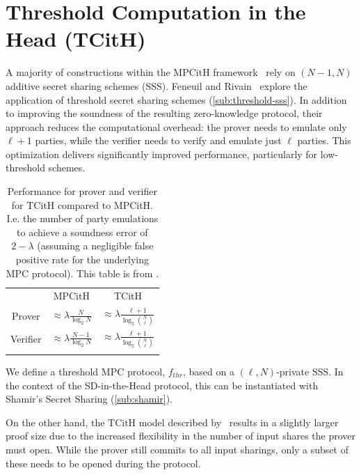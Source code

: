 \documentclass[11pt]{report}
\theoremstyle{definition}
\theoremstyle{plain}
\begin{document}
\section{Threshold Computation in the Head (TCitH)}\label{sec:threshold-mpc}

A majority of constructions within the MPCitH framework~\cite{baum2020concretely,feneuil2022syndrome,katz2018improved} rely on $ (N-1, N) $ additive secret sharing schemes (SSS). Feneuil and Rivain~\cite{feneuil2023threshold,feneuil2023threshold2} explore the application of threshold secret sharing schemes (\autoref{sub:threshold-sss}). In addition to improving the soundness of the resulting zero-knowledge protocol, their approach reduces the computational overhead: the prover needs to emulate only $ \ell + 1 $ parties, while the verifier needs to verify and emulate just $ \ell $ parties. This optimization delivers significantly improved performance, particularly for low-threshold schemes.

\begin{table}[]
  \centering
  \def\arraystretch{1.5}%
  \begin{tabular}{cc|c}
    \textbf{} & MPCitH                                  & TCitH                                                      \\ \arrayrulecolor{darkgray}\hline
    Prover    & $ \approx \lambda \frac{N}{\log_2 N}$   & $ \approx \lambda \frac{\ell + 1}{\log_2 \binom{N}{\ell}}$ \\ \arrayrulecolor{lightgray}\hline
    Verifier  & $ \approx \lambda \frac{N-1}{\log_2 N}$ & $ \approx \lambda \frac{\ell + 1}{\log_2 \binom{N}{\ell}}$ \\ \arrayrulecolor{darkgray}\hline
  \end{tabular}
  \caption{Performance for prover and verifier for TCitH compared to MPCitH. I.e. the number of party emulations to achieve a soundness error of $2-\lambda$ (assuming a negligible false positive rate for the underlying MPC protocol). This table is from \cite{feneuil2023threshold}.}\label{tbl:tcith-performance}
\end{table}

We define a threshold MPC protocol, $ f_{thr} $, based on a $ (\ell, N) $-private SSS. In the context of the SD-in-the-Head protocol, this can be instantiated with Shamir's Secret Sharing (\autoref{sub:shamir}).

On the other hand, the TCitH model described by~\cite{feneuil2023threshold} results in a slightly larger proof size due to the increased flexibility in the number of input shares the prover must open. While the prover still commits to all input sharings, only a subset of these needs to be opened during the protocol.
\end{document}

